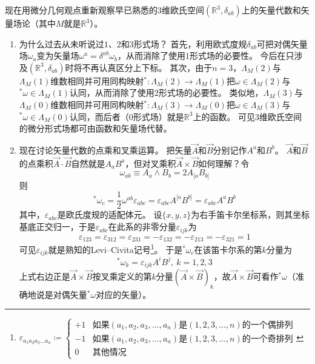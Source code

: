 现在用微分几何观点重新观察早已熟悉的$3$维欧氏空间$(\mathbb{R}^3, \delta_{ab})$上的矢量代数和矢量场论（其中$M$就是$\mathbb{R}^3$）。

\begin{enumerate}[（1）]
    \item 为什么过去从未听说过$1$、$2$和$3$形式场？
    首先，利用欧式度规$\delta_{ab}$可把对偶矢量场$\omega_a$变为矢量场$\omega^a = \delta^{ab}\omega_b$，从而消除了使用$1$形式场的必要性。
    今后在只涉及$(\mathbb{R}^3, \delta_{ab})$时将不再认真区分上下标。
    其次，由于$n = 3$，$\Lambda_M(2)$与$\Lambda_M(1)$维数相同并可用同构映射$^* \colon \Lambda_M(2) \to \Lambda_M(1)$把$\omega \in \Lambda_M(2)$与$^*\omega \in \Lambda_M(1)$认同，从而消除了使用$2$形式场的必要性。
    类似地，$\Lambda_M(3)$与$\Lambda_M(0)$维数相同并可用同构映射$^* \colon \Lambda_M(3) \to \Lambda_M(0)$把$\omega \in \Lambda_M(3)$与$^*\omega \in \Lambda_M(0)$认同，而后者（$0$形式场）就是$\mathbb{R}^3$上的函数。
    可见$3$维欧氏空间的微分形式场都可由函数和矢量场代替。
    \item 现在讨论矢量代数的点乘和叉乘运算。
    把矢量$\vec A$和$\vec B$分别记作$A^a$和$B^b$。
    $\vec A$和$\vec B$的点乘积$\vec A \cdot \vec B$自然就是$A_aB^a$，但对叉乘积$\vec A \times \vec B$如何理解？令
    $$\omega_{ab} \equiv A_a \wedge B_b = 2A_{[a}B_{b]}$$
    则
    $$^*\omega_c = \frac{1}{2}\omega^{ab}\varepsilon_{abc} = \varepsilon_{abc}A^{[a}B^{b]} = \varepsilon_{abc}A^{a}B^{b}$$
    其中，$\varepsilon_{abc}$是欧氏度规的适配体元。
    设$\{x, y, z\}$为右手笛卡尔坐标系，则其坐标基底正交归一，于是$\varepsilon_{abc}$在此系的非零分量$\varepsilon_{ijk}$为
    $$\varepsilon_{123} = \varepsilon_{312} = \varepsilon_{231} = -\varepsilon_{132} = -\varepsilon_{213} = -\varepsilon_{321} = 1$$
    可见$\varepsilon_{ijk}$就是熟知的Levi--Civita记号\footnote{$
        \varepsilon_{a_1 a_2 a_3 \ldots a_n} \coloneq
        \begin{cases}
        +1 & \text{如果}(a_1 , a_2 , a_3 , \ldots , a_n) \text{是} (1,2,3,\dots,n) \text{的一个偶排列}  \\
        -1 & \text{如果}(a_1 , a_2 , a_3 , \ldots , a_n) \text{是} (1,2,3,\dots,n) \text{的一个奇排列} \\
        0 & \text{其他情况}
        \end{cases}
    $}。
    于是$^*\omega_c$在该笛卡尔系的第$k$分量为
    $$^*\omega_k = \varepsilon_{ijk}A^iB^j, ~ k = 1, 2, 3$$
    上式右边正是$\vec A \times \vec B$按叉乘定义的第$k$分量$(\vec A \times \vec B)_k$，故$\vec A \times \vec B$可看作$^*\omega$（准确地说是对偶矢量$^*\omega$对应的矢量）。

\end{enumerate}
